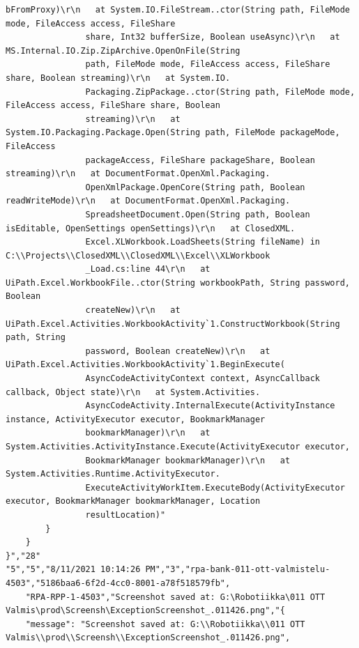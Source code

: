 \begin{Verbatim}[fontsize=\tiny]
                bFromProxy)\r\n   at System.IO.FileStream..ctor(String path, FileMode mode, FileAccess access, FileShare
                share, Int32 bufferSize, Boolean useAsync)\r\n   at MS.Internal.IO.Zip.ZipArchive.OpenOnFile(String
                path, FileMode mode, FileAccess access, FileShare share, Boolean streaming)\r\n   at System.IO.
                Packaging.ZipPackage..ctor(String path, FileMode mode, FileAccess access, FileShare share, Boolean
                streaming)\r\n   at System.IO.Packaging.Package.Open(String path, FileMode packageMode, FileAccess
                packageAccess, FileShare packageShare, Boolean streaming)\r\n   at DocumentFormat.OpenXml.Packaging.
                OpenXmlPackage.OpenCore(String path, Boolean readWriteMode)\r\n   at DocumentFormat.OpenXml.Packaging.
                SpreadsheetDocument.Open(String path, Boolean isEditable, OpenSettings openSettings)\r\n   at ClosedXML.
                Excel.XLWorkbook.LoadSheets(String fileName) in C:\\Projects\\ClosedXML\\ClosedXML\\Excel\\XLWorkbook
                _Load.cs:line 44\r\n   at UiPath.Excel.WorkbookFile..ctor(String workbookPath, String password, Boolean
                createNew)\r\n   at UiPath.Excel.Activities.WorkbookActivity`1.ConstructWorkbook(String path, String
                password, Boolean createNew)\r\n   at UiPath.Excel.Activities.WorkbookActivity`1.BeginExecute(
                AsyncCodeActivityContext context, AsyncCallback callback, Object state)\r\n   at System.Activities.
                AsyncCodeActivity.InternalExecute(ActivityInstance instance, ActivityExecutor executor, BookmarkManager
                bookmarkManager)\r\n   at System.Activities.ActivityInstance.Execute(ActivityExecutor executor,
                BookmarkManager bookmarkManager)\r\n   at System.Activities.Runtime.ActivityExecutor.
                ExecuteActivityWorkItem.ExecuteBody(ActivityExecutor executor, BookmarkManager bookmarkManager, Location
                resultLocation)"
        }
    }
}","28"
"5","5","8/11/2021 10:14:26 PM","3","rpa-bank-011-ott-valmistelu-4503","5186baa6-6f2d-4cc0-8001-a78f518579fb",
    "RPA-RPP-1-4503","Screenshot saved at: G:\Robotiikka\011 OTT Valmis\prod\Screensh\ExceptionScreenshot_.011426.png","{
    "message": "Screenshot saved at: G:\\Robotiikka\\011 OTT Valmis\\prod\\Screensh\\ExceptionScreenshot_.011426.png",

\end{Verbatim}
